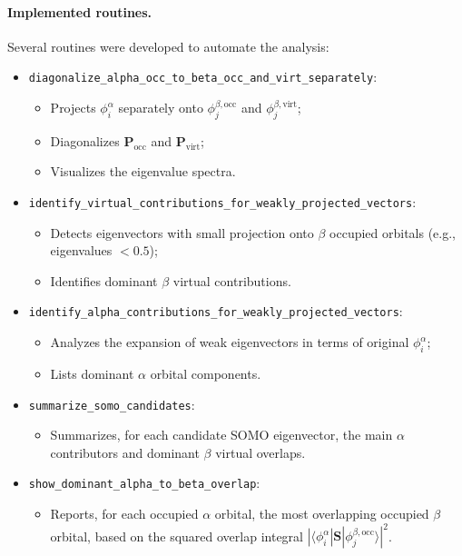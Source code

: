 \paragraph{Implemented routines.}
Several routines were developed to automate the analysis:

\begin{itemize}
    \item \texttt{diagonalize\_alpha\_occ\_to\_beta\_occ\_and\_virt\_separately}: 
    \begin{itemize}
        \item Projects $\phi_{i}^{\alpha}$ separately onto $\phi_{j}^{\beta,\text{occ}}$ and $\phi_{j}^{\beta,\text{virt}}$;
        \item Diagonalizes $\boldsymbol{P}_{\text{occ}}$ and $\boldsymbol{P}_{\text{virt}}$;
        \item Visualizes the eigenvalue spectra.
    \end{itemize}
    
    \item \texttt{identify\_virtual\_contributions\_for\_weakly\_projected\_vectors}:
    \begin{itemize}
        \item Detects eigenvectors with small projection onto $\beta$ occupied orbitals (e.g., eigenvalues $< 0.5$);
        \item Identifies dominant $\beta$ virtual contributions.
    \end{itemize}

    \item \texttt{identify\_alpha\_contributions\_for\_weakly\_projected\_vectors}:
    \begin{itemize}
        \item Analyzes the expansion of weak eigenvectors in terms of original $\phi_{i}^{\alpha}$;
        \item Lists dominant $\alpha$ orbital components.
    \end{itemize}

    \item \texttt{summarize\_somo\_candidates}:
    \begin{itemize}
        \item Summarizes, for each candidate SOMO eigenvector, the main $\alpha$ contributors and dominant $\beta$ virtual overlaps.
    \end{itemize}

    \item \texttt{show\_dominant\_alpha\_to\_beta\_overlap}:
    \begin{itemize}
        \item Reports, for each occupied $\alpha$ orbital, the most overlapping occupied $\beta$ orbital, based on the squared overlap integral $|\langle \phi_{i}^{\alpha} | \boldsymbol{S} | \phi_{j}^{\beta,\text{occ}} \rangle|^{2}$.
    \end{itemize}
\end{itemize}


